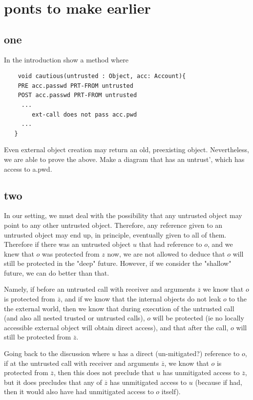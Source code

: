  \newcommand{\sdOct}[1]{#1}
\newcommand{\re}{\mathit{e}}

\section{ponts to make earlier}

\subsection{one}
In the introduction show a method where
\begin{lstlisting}
    void cautious(untrusted : Object, acc: Account){
    PRE acc.passwd PRT-FROM untrusted
    POST acc.passwd PRT-FROM untrusted
     ...
        ext-call does not pass acc.pwd
     ...
   }
\end{lstlisting}

Even external object creation may return an old, preexisting object.
Nevertheless, we are able to prove the above. Make a diagram that has an untrust', which has access to a.pwd. 


\subsection{two}
In our setting, we must deal with the possibility  that any untrusted object may point to any other untrusted object.
Therefore, any reference given to an untrusted object may end up, in principle,  eventually given to all of them.
Therefore if there was an untrusted object $u$ that had reference to $o$,  and we knew that $o$ was protected from $z$ now, we are not
allowed   to deduce that $o$ will still be protected in the "deep" future.
However, if we consider the "shallow" future, we can do better than that.

Namely, if  before an untrusted call with receiver and arguments $\overline z$ we know that $o$ is protected from $\overline z$, and if we know that the internal objects do not leak $o$ to the the external world, then we know that during execution of the untrusted call (and also all nested trusted or untrusted calls), $o$ will be protected (ie no locally accessible external object will obtain direct access), and that after the call, $o$ will still be protected from $\overline z$.

Going back to the discussion where $u$ has a direct (un-mitigated?) reference to $o$, if at the untrusted call with receiver and arguments $\overline z$, we know that $o$ is protected from $\overline z$, then this does not preclude that $u$ has unmitigated access to $\overline z$, but it does precludes that any of  $\overline z$ has unmitigated access to $u$ (because if had, then it would also have had unmitigated access to $o$ itself).

